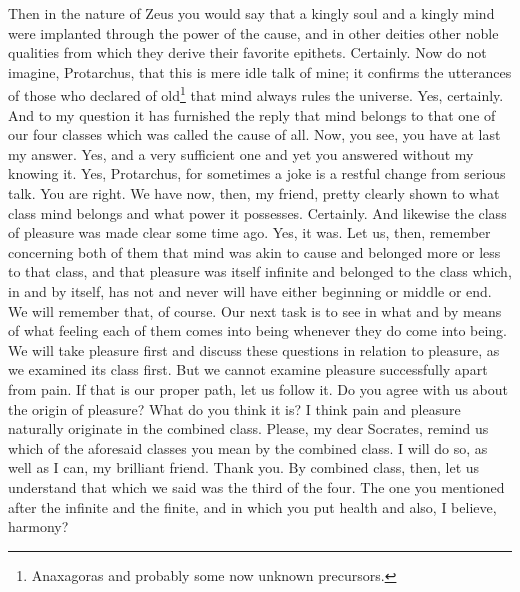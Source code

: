 \documentclass[letterpaper,12pt]{article}
\newcommand{\stephpag}[1]{\marginnote{\small\itshape\fontfamily{ppl}\selectfont #1}}
\begin{document}
\begin{drama}
Then in the nature of Zeus you would say that a kingly soul \stephpag{d} and a kingly mind were implanted through the power of the cause, and in other deities other noble qualities from which they derive their favorite epithets.
\protarchusspeaks
Certainly.
\socratesspeaks
Now do not imagine, Protarchus, that this is mere idle talk of mine; it confirms the utterances of those who declared of old\footnote{Anaxagoras and probably some now unknown precursors.} that mind always rules the universe.
\protarchusspeaks
Yes, certainly.
\socratesspeaks
And to my question it has furnished the reply \stephpag{e} that mind belongs to that one of our four classes which was called the cause of all. Now, you see, you have at last my answer.
\protarchusspeaks
Yes, and a very sufficient one and yet you answered without my knowing it.
\socratesspeaks
Yes, Protarchus, for sometimes a joke is a restful change from serious talk.
\protarchusspeaks
You are right.
\socratesspeaks
We have now, then, my friend, pretty clearly shown to what class mind belongs \stephpag{31 a} and what power it possesses.
\protarchusspeaks
Certainly.
\socratesspeaks
And likewise the class of pleasure was made clear some time ago.
\protarchusspeaks
Yes, it was.
\socratesspeaks
Let us, then, remember concerning both of them that mind was akin to cause and belonged more or less to that class, and that pleasure was itself infinite and belonged to the class which, in and by itself, has not and never will have either beginning or middle or end. \stephpag{b}
\protarchusspeaks
We will remember that, of course.
\socratesspeaks
Our next task is to see in what and by means of what feeling each of them comes into being whenever they do come into being. We will take pleasure first and discuss these questions in relation to pleasure, as we examined its class first. But we cannot examine pleasure successfully apart from pain.
\protarchusspeaks
If that is our proper path, let us follow it.
\socratesspeaks
Do you agree with us about the origin of pleasure? \stephpag{c}
\protarchusspeaks
What do you think it is?
\socratesspeaks
I think pain and pleasure naturally originate in the combined class.
\protarchusspeaks
Please, my dear Socrates, remind us which of the aforesaid classes you mean by the combined class.
\socratesspeaks
I will do so, as well as I can, my brilliant friend.
\protarchusspeaks
Thank you.
\socratesspeaks
By combined class, then, let us understand that which we said was the third of the four.
\protarchusspeaks
The one you mentioned after the infinite and the finite, and in which you put health and also, I believe, harmony? \stephpag{d}

\end{drama}
\end{document}
